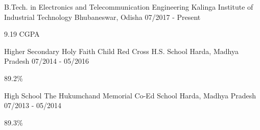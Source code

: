 

\begin{cventries}

  \cventry
    {B.Tech. in  Electronics and Telecommunication Engineering} %
    {Kalinga Institute of Industrial Technology} %
    {Bhubaneswar, Odisha} %
    {07/2017 - Present} %
    {
      \begin{cvitems} %
        \item {9.19 CGPA}
      \end{cvitems}
    }

\end{cventries}

\begin{cventries}

  \cventry
    {Higher Secondary} %
    {Holy Faith Child Red Cross H.S. School} %
    {Harda, Madhya Pradesh} %
    {07/2014 - 05/2016} %
    {
      \begin{cvitems} %
        \item {89.2\%}
      \end{cvitems}
    }

\end{cventries}

\begin{cventries}

  \cventry
    {High School} %
    {The Hukumchand Memorial Co-Ed School} %
    {Harda, Madhya Pradesh} %
    {07/2013 - 05/2014} %
    {
      \begin{cvitems} %
        \item {89.3\%}
      \end{cvitems}
    }

\end{cventries}